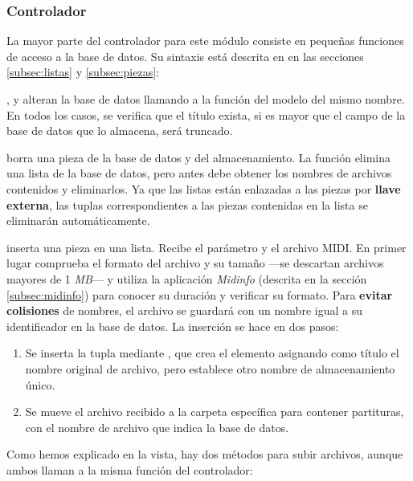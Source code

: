 \subsubsection{Controlador}

La mayor parte del controlador para este módulo consiste en pequeñas funciones de acceso a la base de datos. Su sintaxis está descrita en en las secciones \ref{subsec:listas} y \ref{subsec:piezas}:

,  y  alteran la base de datos llamando a la función del modelo del mismo nombre. En todos los casos, se verifica que el título exista, si es mayor que el campo de la base de datos que lo almacena, será truncado.

 borra una pieza de la base de datos y del almacenamiento. La función  elimina una lista de la base de datos, pero antes debe obtener los nombres de archivos contenidos y eliminarlos. Ya que las listas están enlazadas a las piezas por \textbf{llave externa}, las tuplas correspondientes a las piezas contenidas en la lista se eliminarán automáticamente.

 inserta una pieza en una lista. Recibe el parámetro  y el archivo \acrshort{MIDI}. En primer lugar comprueba el formato del archivo y su tamaño ---se descartan archivos mayores de 1 \textit{MB}--- y utiliza la aplicación \textit{Midinfo} (descrita en la sección \ref{subsec:midinfo}) para conocer su duración y verificar su formato. Para \textbf{evitar colisiones} de nombres, el archivo se guardará con un nombre igual a su identificador en la base de datos. La inserción se hace en dos pasos:

\begin{enumerate}
	\item Se inserta la tupla mediante , que crea el elemento asignando como título el nombre original de archivo, pero establece otro nombre de almacenamiento único.
	
	\item Se mueve el archivo recibido a la carpeta específica para contener partituras, con el nombre de archivo que indica la base de datos.
\end{enumerate}

Como hemos explicado en la vista, hay dos métodos para subir archivos, aunque ambos llaman a la misma función del controlador:

